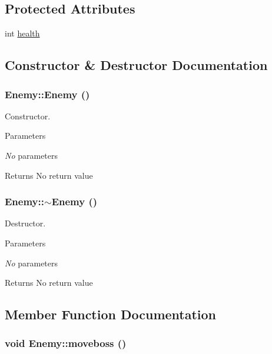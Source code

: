 \subsection*{Protected Attributes}
\begin{DoxyCompactItemize}
\item 
int \hyperlink{classEnemy_aedd5e7bf8ef07ee97be433c853a10d8d}{health}
\end{DoxyCompactItemize}


\subsection{Constructor \& Destructor Documentation}
\hypertarget{classEnemy_a94f30d348b6d2840fd71675472ba38dd}{
\subsubsection[{Enemy}]{\setlength{\rightskip}{0pt plus 5cm}Enemy::Enemy ()}}
\label{classEnemy_a94f30d348b6d2840fd71675472ba38dd}


Constructor. 
\begin{DoxyParams}{Parameters}
\item[{\em No}]parameters \end{DoxyParams}
\begin{DoxyReturn}{Returns}
No return value 
\end{DoxyReturn}
\hypertarget{classEnemy_ac0eec4755e28c02688065f9657150ac3}{
\subsubsection[{$\sim$Enemy}]{\setlength{\rightskip}{0pt plus 5cm}Enemy::$\sim$Enemy ()}}
\label{classEnemy_ac0eec4755e28c02688065f9657150ac3}


Destructor. 
\begin{DoxyParams}{Parameters}
\item[{\em No}]parameters \end{DoxyParams}
\begin{DoxyReturn}{Returns}
No return value 
\end{DoxyReturn}


\subsection{Member Function Documentation}
\hypertarget{classEnemy_a405168f47abea55981313377385d6c37}{
\subsubsection[{moveboss}]{\setlength{\rightskip}{0pt plus 5cm}void Enemy::moveboss ()}}
\label{classEnemy_a405168f47abea55981313377385d6c37}


